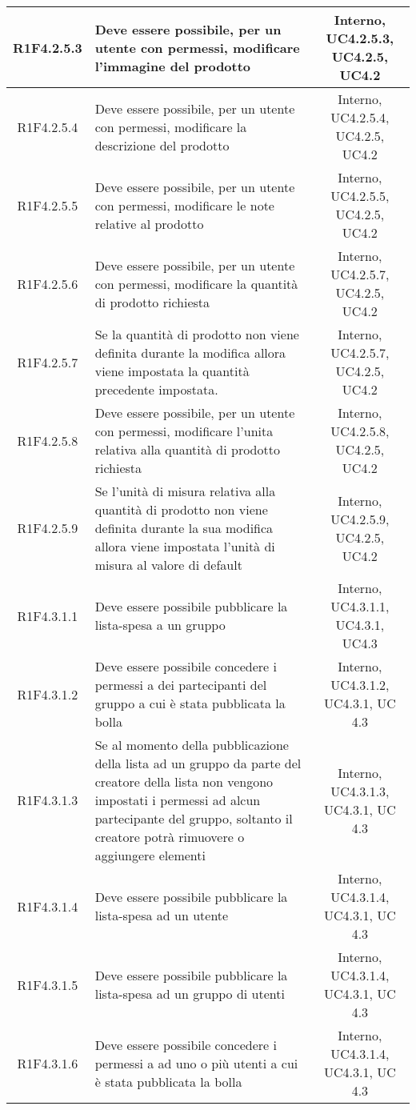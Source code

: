 \begin{longtable}{|c|>{\centering}m{7cm}|c|}
			\hline
			R1F4.2.5.3 & Deve essere possibile, per un utente con permessi, modificare l'immagine del prodotto & Interno, UC4.2.5.3, UC4.2.5, UC4.2 \\
			\hline
			R1F4.2.5.4 & Deve essere possibile, per un utente con permessi, modificare la descrizione del prodotto & Interno, UC4.2.5.4, UC4.2.5, UC4.2 \\
			\hline
			R1F4.2.5.5 & Deve essere possibile, per un utente con permessi, modificare le note relative al prodotto & Interno, UC4.2.5.5, UC4.2.5, UC4.2 \\
			\hline
			R1F4.2.5.6 & Deve essere possibile, per un utente con permessi, modificare la quantità di prodotto richiesta & Interno, UC4.2.5.7, UC4.2.5, UC4.2 \\
			\hline
			R1F4.2.5.7 & Se la quantità di prodotto non viene definita durante la modifica allora viene impostata la quantità precedente impostata. & Interno, UC4.2.5.7, UC4.2.5, UC4.2 \\
			\hline
			R1F4.2.5.8 & Deve essere possibile, per un utente con permessi, modificare l'unita relativa alla quantità di prodotto richiesta & Interno, UC4.2.5.8, UC4.2.5, UC4.2 \\
			\hline
			R1F4.2.5.9 & Se l'unità di misura relativa alla quantità di prodotto non viene definita durante la sua modifica allora viene impostata l'unità di misura al valore di default & Interno, UC4.2.5.9, UC4.2.5, UC4.2 \\
			\hline
			R1F4.3.1.1 & Deve essere possibile pubblicare la lista-spesa a un gruppo & Interno, UC4.3.1.1, UC4.3.1, UC4.3 \\
			\hline
			R1F4.3.1.2 & Deve essere possibile concedere i permessi a dei partecipanti del gruppo a cui è stata pubblicata la bolla & Interno, UC4.3.1.2, UC4.3.1, UC 4.3 \\
			\hline
			R1F4.3.1.3 & Se al momento della pubblicazione della lista ad un gruppo da parte del creatore della lista non vengono impostati i permessi ad alcun partecipante del gruppo, soltanto il creatore potrà rimuovere o aggiungere elementi & Interno, UC4.3.1.3, UC4.3.1, UC 4.3 \\
			\hline
			R1F4.3.1.4 & Deve essere possibile pubblicare la lista-spesa ad un utente & Interno, UC4.3.1.4, UC4.3.1, UC 4.3 \\
			\hline
			R1F4.3.1.5 & Deve essere possibile pubblicare la lista-spesa ad un gruppo di utenti & Interno, UC4.3.1.4, UC4.3.1, UC 4.3 \\
			\hline
			R1F4.3.1.6 & Deve essere possibile concedere i permessi a ad uno o più utenti a cui è stata pubblicata la bolla & Interno, UC4.3.1.4, UC4.3.1, UC 4.3 \\

\end{longtable}
